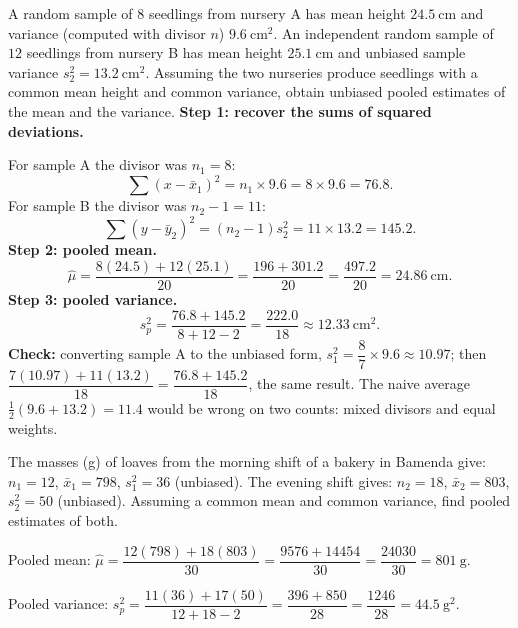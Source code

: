 \documentclass[11pt]{article}
\begin{document}
\begin{exoresolu}
A random sample of $8$ seedlings from nursery A has mean height $24.5\ \mathrm{cm}$ and variance (computed with divisor $n$) $9.6\ \mathrm{cm}^2$. An independent random sample of $12$ seedlings from nursery B has mean height $25.1\ \mathrm{cm}$ and unbiased sample variance $s_2^2 = 13.2\ \mathrm{cm}^2$. Assuming the two nurseries produce seedlings with a common mean height and common variance, obtain unbiased pooled estimates of the mean and the variance.
\tcblower
\textbf{Step 1: recover the sums of squared deviations.}

For sample A the divisor was $n_1 = 8$:
\[
\sum(x-\bar{x}_1)^2 = n_1 \times 9.6 = 8 \times 9.6 = 76.8.
\]
For sample B the divisor was $n_2 - 1 = 11$:
\[
\sum(y-\bar{y}_2)^2 = (n_2-1)s_2^2 = 11 \times 13.2 = 145.2.
\]
\textbf{Step 2: pooled mean.}
\[
\hat{\mu} = \frac{8(24.5) + 12(25.1)}{20} = \frac{196 + 301.2}{20} = \frac{497.2}{20} = 24.86\ \mathrm{cm}.
\]
\textbf{Step 3: pooled variance.}
\[
s_p^2 = \frac{76.8 + 145.2}{8+12-2} = \frac{222.0}{18} \approx 12.33\ \mathrm{cm}^2.
\]
\textbf{Check:} converting sample A to the unbiased form, $s_1^2 = \dfrac{8}{7}\times 9.6 \approx 10.97$; then $\dfrac{7(10.97)+11(13.2)}{18} = \dfrac{76.8+145.2}{18}$, the same result. The naive average $\tfrac12(9.6+13.2) = 11.4$ would be wrong on two counts: mixed divisors and equal weights.
\end{exoresolu}

\begin{exercice}
The masses (g) of loaves from the morning shift of a bakery in Bamenda give: $n_1 = 12$, $\bar{x}_1 = 798$, $s_1^2 = 36$ (unbiased). The evening shift gives: $n_2 = 18$, $\bar{x}_2 = 803$, $s_2^2 = 50$ (unbiased). Assuming a common mean and common variance, find pooled estimates of both.
\end{exercice}

\begin{corrige}[Exercise 1]
Pooled mean: $\hat{\mu} = \dfrac{12(798) + 18(803)}{30} = \dfrac{9576 + 14454}{30} = \dfrac{24030}{30} = 801\ \mathrm{g}$.

Pooled variance: $s_p^2 = \dfrac{11(36) + 17(50)}{12+18-2} = \dfrac{396 + 850}{28} = \dfrac{1246}{28} = 44.5\ \mathrm{g}^2$.
\end{corrige}
\end{document}
